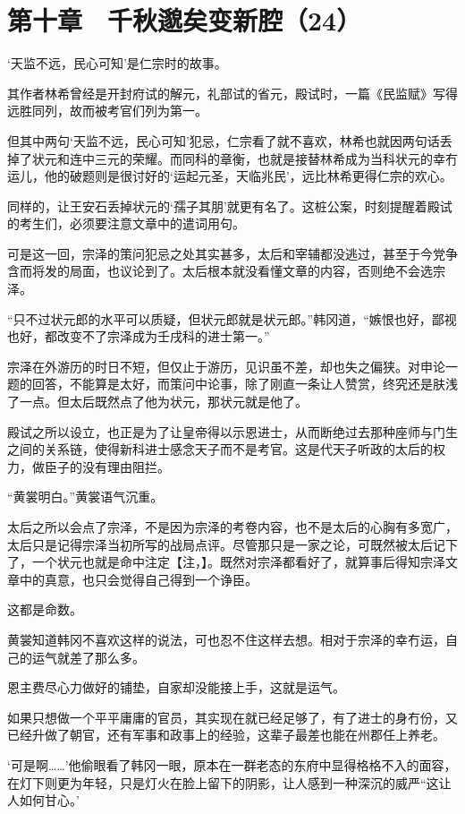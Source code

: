 \section{第十章　千秋邈矣变新腔（24）}

‘天监不远，民心可知’是仁宗时的故事。

其作者林希曾经是开封府试的解元，礼部试的省元，殿试时，一篇《民监赋》写得远胜同列，故而被考官们列为第一。

但其中两句‘天监不远，民心可知’犯忌，仁宗看了就不喜欢，林希也就因两句话丢掉了状元和连中三元的荣耀。而同科的章衡，也就是接替林希成为当科状元的幸冇运儿，他的破题则是很讨好的‘运起元圣，天临兆民’，远比林希更得仁宗的欢心。

同样的，让王安石丢掉状元的‘孺子其朋’就更有名了。这桩公案，时刻提醒着殿试的考生们，必须要注意文章中的遣词用句。

可是这一回，宗泽的策问犯忌之处其实甚多，太后和宰辅都没逃过，甚至于今党争含而将发的局面，也议论到了。太后根本就没看懂文章的内容，否则绝不会选宗泽。

“只不过状元郎的水平可以质疑，但状元郎就是状元郎。”韩冈道，“嫉恨也好，鄙视也好，都改变不了宗泽成为壬戌科的进士第一。”

宗泽在外游历的时日不短，但仅止于游历，见识虽不差，却也失之偏狭。对申论一题的回答，不能算是太好，而策问中论事，除了刚直一条让人赞赏，终究还是肤浅了一点。但太后既然点了他为状元，那状元就是他了。

殿试之所以设立，也正是为了让皇帝得以示恩进士，从而断绝过去那种座师与门生之间的关系链，使得新科进士感念天子而不是考官。这是代天子听政的太后的权力，做臣子的没有理由阻拦。

“黄裳明白。”黄裳语气沉重。

太后之所以会点了宗泽，不是因为宗泽的考卷内容，也不是太后的心胸有多宽广，太后只是记得宗泽当初所写的战局点评。尽管那只是一家之论，可既然被太后记下了，一个状元也就是命中注定【注，】。既然对宗泽都看好了，就算事后得知宗泽文章中的真意，也只会觉得自己得到一个诤臣。

这都是命数。

黄裳知道韩冈不喜欢这样的说法，可也忍不住这样去想。相对于宗泽的幸冇运，自己的运气就差了那么多。

恩主费尽心力做好的铺垫，自家却没能接上手，这就是运气。

如果只想做一个平平庸庸的官员，其实现在就已经足够了，有了进士的身冇份，又已经升做了朝官，还有军事和政事上的经验，这辈子最差也能在州郡任上养老。

‘可是啊……’他偷眼看了韩冈一眼，原本在一群老态的东府中显得格格不入的面容，在灯下则更为年轻，只是灯火在脸上留下的阴影，让人感到一种深沉的威严“这让人如何甘心。’

